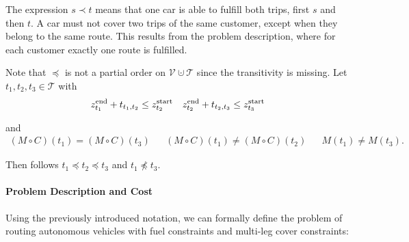 The expression $s\prec t$ means that one car is able to fulfill both trips, first $s$ and then $t$. A car must not cover two trips of the same customer, except when they belong to the same route. This results from the problem description, where for each customer exactly one route is fulfilled. 

\begin{remark}

Note that $\preceq$ is not a partial order on $\mathcal{V}\cupdot\mathcal{T}$ since the transitivity is missing. Let $t_1,t_2,t_3\in\mathcal{T}$ with 
\begin{align*}
	z^{\operatorname{end}}_{t_1} + t_{t_1,t_2} \leq z^{\operatorname{start}}_{t_2} && z^{\operatorname{end}}_{t_2} + t_{t_2,t_3} \leq z^{\operatorname{start}}_{t_3}
\end{align*}

and
\begin{align*}
	(M\circ C)\left(t_1\right) = (M\circ C)\left(t_3\right) && (M\circ C)\left(t_1\right) \neq (M\circ C)\left(t_2\right) && M\left(t_1\right)\neq M\left(t_3\right).
\end{align*}

Then follows $t_1 \preceq t_2 \preceq t_3$ and $t_1 \not\preceq t_3$.

\end{remark}

\paragraph{Problem Description and Cost} \parfill

Using the previously introduced notation, we can formally define the problem of routing autonomous vehicles with fuel constraints and multi-leg cover constraints:

